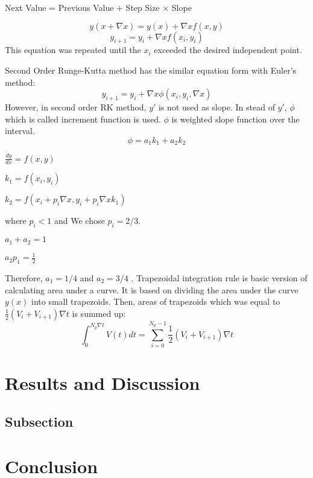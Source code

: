 \documentclass[letterpaper,12pt]{article}
\begin{document}
\begin{center}
Next Value = Previous Value + Step Size $\times $ Slope
\end{center}
\begin{equation}
y(x + \nabla x ) = y(x) + \nabla x f(x,y)
\end{equation}
\begin{equation}
y_{i+1} = y_i + \nabla x f(x_i , y_i)
\label{eq:eul}
\end{equation}
This equation was repeated until the $x_i$ exceeded the desired independent point.

Second Order Runge-Kutta method has the similar equation form with Euler's method:
\begin{equation}
y_{i+1} = y_i + \nabla x \phi (x_i , y_i, \nabla x)
\label{eq:rk2}
\end{equation}
However, in second order RK method, $y\prime $ is not used as slope. In stead of $y\prime $, $\phi$ which is 
called increment function is used. $\phi$ is weighted slope function over the interval.
\begin{equation}
\phi = a_1k_1 + a_2k_2
\end{equation}
\begin{center}
$ \frac{dy}{dx} = f(x,y) $  

\doublespacing
$k_1 = f(x_i,y_i)$ 

\doublespacing
$k_2 = f(x_i+p_i\nabla x, y_i+p_i\nabla x k_1)$
\end{center}
where $p_i<1$  and
We chose $p_i = 2/3 $.
\begin{center}
$a_1+a_2 = 1$ 

\doublespacing
$a_2p_1 = \frac{1}{2}$
\end{center}
Therefore, $a_1=1/4$ and $a_2=3/4$ .
Trapezoidal integration rule is basic version of calculating area under a curve. It is based on
dividing the area under the curve $y(x)$ into small trapezoids. Then, areas of trapezoids which was equal to 
$\frac {1}{2}(V_i+V_{i+1})\nabla t $ is summed up:
\begin{equation}
\int_{0}^{N_p\nabla t} V(t) dt = \sum_{i=0}^{N_p-1} \frac{1}{2}(V_i+V_{i+1}) \nabla t 
\end{equation}

\newpage

\section{Results and Discussion}

\subsection{Subsection}

\section{Conclusion}
\end{document}
